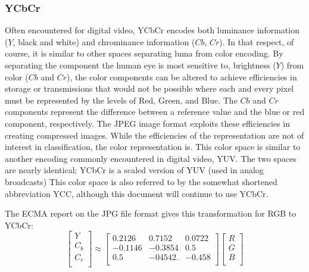 \documentclass[letterpaper]{article}
\begin{document}
{\subsubsection{YCbCr}
Often encountered for digital video, YCbCr encodes both luminance information ($Y$, black and white) and chrominance information ($Cb$, $Cr$). In that respect, of course, it is similar to other spaces separating luma from color encoding. By separating the component the human eye is most sensitive to, brightness ($Y$) from color ($Cb$ and $Cr$), the color components can be altered to achieve efficiencies in storage or transmissions that would not be possible where each and every pixel must be represented by the levels of Red, Green, and Blue.  The $Cb$ and $Cr$ components represent the difference between a reference value and the blue or red component, respectively. The JPEG image format exploits these efficiencies in creating compressed images. While the efficiencies of the representation are not of interest in classification, the color representation is. This color space is similar to another encoding commonly encountered in digital video, YUV. The two spaces are nearly identical; YCbCr is a scaled version of YUV (used in analog broadcasts) This color space is also referred to by the somewhat shortened abbreviation YCC, although this document will continue to use YCbCr.

The ECMA report on the JPG file format gives this transformation for RGB to YCbCr:
\nocite{Ecma2019-yo}
\begin{equation}
	\begin{bmatrix}
	Y \\[0.3em]
	C_b \\[0.3em]
	C_r \\[0.3em]
	\end{bmatrix}
	\approx
	\begin{bmatrix}
	0.2126 & 0.7152 & 0.0722 \\[0.3em]
	-0.1146 & -0.3854 & 0.5 \\[0.3em]
	0.5 & -04542. & -0.458 \\[0.3em]
	\end{bmatrix}
	\begin{bmatrix}
	R \\[0.3em]
	G \\[0.3em]
	B \\[0.3em]
	\end{bmatrix}	
\end{equation}

}
\end{document}
